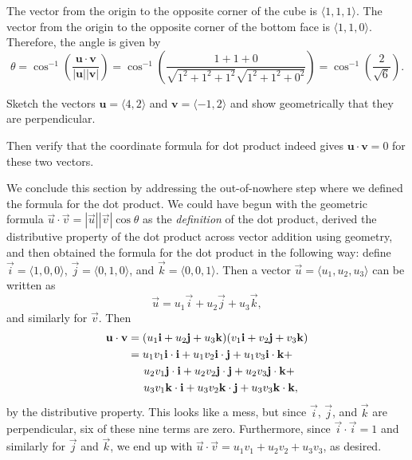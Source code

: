 \documentclass{watsonbook}
\begin{document}
\begin{solution} 
  The vector from the origin to the opposite corner of the cube is $\langle
  1,1,1\rangle$. The vector from the origin to the opposite corner of
  the bottom face is $\langle 1,1,0 \rangle$. Therefore, the angle is given by 
  \[
    \theta = \cos^{-1}\left(\frac{\mathbf{u} \cdot
        \mathbf{v}}{|\mathbf{u}||\mathbf{v}|}\right) = \cos^{-1}\left(
      \frac{1 + 1 + 0}{\sqrt{1^2 + 1^2 + 1^2}\sqrt{1^2+1^2+0^2}}
    \right) = \boxed{\cos^{-1}\left(\frac{2}{\sqrt{6}}\right)}. 
  \]
\end{solution}

\begin{exercise}{}{}
  Sketch the vectors $\mathbf{u} = \langle 4,2 \rangle$ and
  $\mathbf{v} = \langle -1, 2\rangle$ and show geometrically that they
  are perpendicular. 

  Then verify that the coordinate formula for dot product indeed gives 
  $\mathbf{u} \cdot \mathbf{v} = 0$ for these two vectors. 
\end{exercise}

We conclude this section by addressing the out-of-nowhere step where
we defined the formula for the dot product. We could have begun with
the geometric formula
$\vec{u} \cdot \vec{v} = |\vec{u}| |\vec{v}| \cos\theta$ as the
\textit{definition} of the dot product, derived the distributive
property of the dot product across vector addition using geometry, and
then obtained the formula for the dot product in the following 
way: define $\vec{i} = \langle1,0,0\rangle$,
$\vec{j} = \langle0,1,0\rangle$, and $\vec{k} =
\langle0,0,1\rangle$. Then a vector
$\vec{u} = \langle u_1, u_2, u_3\rangle$ can be written as
\[
  \vec{u} = u_1 \vec{i} + u_2 \vec{j} + u_3 \vec{k},
\]
and similarly for $\vec{v}$. Then 
\begin{align*}
  \vec{u} \cdot \vec{v} &= (u_1 \vec{i} + u_2 \vec{j} + u_3
                          \vec{k})(v_1 \vec{i} + v_2 \vec{j} + v_3 \vec{k})  \\
                        &= u_1 v_1 \vec{i} \cdot \vec{i} + u_1 v_2 \vec{i} \cdot
                          \vec{j}  + u_1 v_3 \vec{i} \cdot \vec{k}  + \\ 
                        &\hspace{5mm}  u_2 v_1 \vec{j} \cdot \vec{i} + u_2 v_2 \vec{j} \cdot
                          \vec{j}  + u_2 v_3 \vec{j} \cdot \vec{k}  + \\ 
                        &\hspace{5mm}  u_3 v_1 \vec{k} \cdot \vec{i} + u_3 v_2 \vec{k} \cdot
                          \vec{j}  + u_3 v_3 \vec{k} \cdot \vec{k},
\end{align*}
by the distributive property. This looks like a mess, but since
$\vec{i}$,  $\vec{j}$, and  $\vec{k}$ are 
perpendicular, six of these nine terms are zero. Furthermore, since
$\vec{i}\cdot \vec{i} = 1$ and similarly for $\vec{j}$ and
$\vec{k}$, we end up with $  \vec{u} \cdot \vec{v}  = u_1 v_1
+ u_2 v_2 + u_3 v_3$, as desired.
\end{document}
